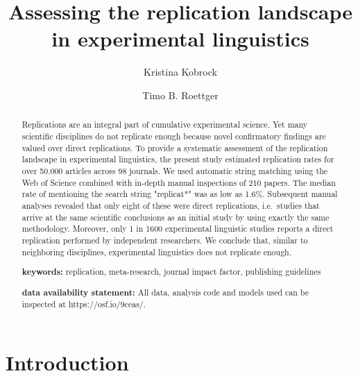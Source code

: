 \documentclass[]{elsarticle} %
\begin{document}
\begin{frontmatter}

  \title{Assessing the replication landscape in experimental linguistics}
    \author[University of Osnabrück]{Kristina Kobrock}
    \author[Universitetet i Oslo]{Timo B. Roettger}
      \address[University of Osnabrück]{University of Osnabrück, Institute of Cognitive Science, Wachsbleiche 27, 49090 Osnabrück, Germany}
    \address[Universitetet i Oslo]{Universitetet i Oslo, Department of Linguistics and Scandinavian Studies, Niels Henrik Abels vei 36, 0313 Oslo, Norway}
  
  \begin{abstract}
  Replications are an integral part of cumulative experimental science. Yet many scientific disciplines do not replicate enough because novel confirmatory findings are valued over direct replications. To provide a systematic assessment of the replication landscape in experimental linguistics, the present study estimated replication rates for over 50.000 articles across 98 journals. We used automatic string matching using the Web of Science combined with in-depth manual inspections of 210 papers. The median rate of mentioning the search string "replicat*" was as low as 1.6\%. Subsequent manual analyses revealed that only eight of these were direct replications, i.e.~studies that arrive at the same scientific conclusions as an initial study by using exactly the same methodology. Moreover, only 1 in 1600 experimental linguistic studies reports a direct replication performed by independent researchers. We conclude that, similar to neighboring disciplines, experimental linguistics does not replicate enough.

  \textbf{keywords:} replication, meta-research, journal impact factor, publishing guidelines

  \textbf{data availability statement:} All data, analysis code and models used can be inspected at https://osf.io/9ceas/.
  \end{abstract}
  
 \end{frontmatter}

\hypertarget{introduction}{%
\section{Introduction}\label{introduction}}
\end{document}
